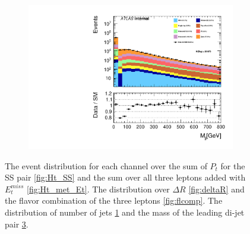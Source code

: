 \begin{figure}
{\begin{subfigure}{.425\textwidth}
        \caption{}
        \label{fig:njet_SG}
    \end{subfigure}
    \hfill
    \begin{subfigure}{.425\textwidth}
        \includegraphics[width=\textwidth]{Figures/FeaturesHistograms/M_jj.pdf}
        \caption{}
        \label{fig:M_jj}
    \end{subfigure}
    }
    \caption{The event distribution for each channel over the sum of $P_t$
    for the SS pair \ref{fig:Ht_SS} and the sum over all three leptons added with $E_t^{miss}$
    \ref{fig:Ht_met_Et}. The distribution over $\Delta R$ \ref{fig:deltaR} and the flavor 
    combination of the three leptons \ref{fig:flcomp}. The distribution of number of jets 
    \ref{fig:njet_SG} and the mass of the leading di-jet pair \ref{fig:M_jj}.}
\end{figure}
\newpage
